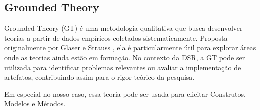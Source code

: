 \subsection{Grounded Theory}

Grounded Theory (GT) é uma metodologia qualitativa que busca desenvolver teorias a partir de dados empíricos coletados sistematicamente. Proposta originalmente por Glaser e Strauss \cite{glaser1967discovery}, ela é particularmente útil para explorar áreas onde as teorias ainda estão em formação. 
No contexto da DSR, a GT pode ser utilizada para identificar problemas relevantes ou avaliar a implementação de artefatos, contribuindo assim para o rigor teórico da pesquisa.

Em especial no nosso caso, essa teoria pode ser usada para elicitar Construtos, Modelos e Métodos.

